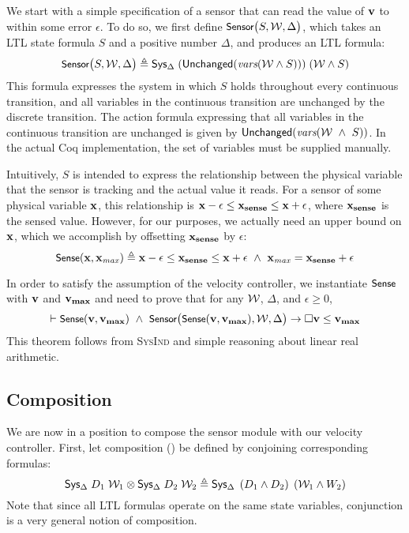 We start with a simple specification of a sensor that can read the value of
$\mathbf{v}$ to within some error $\epsilon$.  To do so, we first define
${\small \textsf{Sensor}}\big(S,\mathcal{W}, \Delta\big)$, which takes an LTL state formula $S$ and a
positive number $\Delta$, and produces an LTL formula:
\[
{\small \textsf{Sensor}}\big(S,\mathcal{W}, \Delta\big) \triangleq {\textsf{Sys}}{}_{\Delta}\;(\mathsf{Unchanged}(\textit{vars}(\mathcal{W} \wedge S)))\;(\mathcal{W} \wedge S)
\]
This formula expresses the system in which $S$ holds throughout every
continuous transition, and all variables in the continuous transition are
unchanged by the discrete transition. The action formula expressing that
all variables in the continuous transition are unchanged is given by
$\mathsf{Unchanged}(\textit{vars}(\mathcal{W}~\wedge~S))$. In the actual Coq implementation, the set
of variables must be supplied manually.

Intuitively, $S$ is intended to express the relationship between the
physical variable that the sensor is tracking and the actual value it
reads.  For a sensor of some physical variable $\mathbf{x}$, this relationship is
$\mathbf{x} - \epsilon \leq \mathbf{x_{sense}} \leq \mathbf{x} + \epsilon$, where $\mathbf{x_{sense}}$ is the
sensed value.  However, for our purposes, we actually need an upper bound
on $\mathbf{x}$, which we accomplish by offsetting $\mathbf{x_{sense}}$ by $\epsilon$:
\[
{\small \textsf{Sense}}(\mathbf{x},\mathbf{x_{\it max}}) \triangleq
\mathbf{x} - \epsilon \leq \mathbf{x_{sense}} \leq \mathbf{x} + \epsilon~\wedge~\mathbf{x_{\it max}} = \mathbf{x_{sense}} + \epsilon
\]

In order to satisfy the assumption of the velocity controller, we
instantiate ${\small \textsf{Sense}}{}$ with $\mathbf{v}$ and $\mathbf{v_{max}}$ and need to prove that for
any $\mathcal{W}$, $\Delta$, and $\epsilon \geq 0$,
\begin{equation}
\vdash {\small \textsf{Sense}}(\mathbf{v},\mathbf{v_{max}})~\wedge~{\small \textsf{Sensor}}\big({\small \textsf{Sense}}(\mathbf{v},\mathbf{v_{max}}),\mathcal{W}, \Delta\big) \rightarrow \Box{} \mathbf{v} \leq \mathbf{v_{max}}
\label{thm:sense-safe}
\end{equation}
This theorem follows from \textsc{SysInd} and simple reasoning about linear
real arithmetic.

\subsection{Composition}
We are now in a position to compose the sensor module with our velocity
controller.  First, let \SysA{} composition (\SysConjoin{}) be defined by
conjoining corresponding formulas:
\[
{\textsf{Sys}}{}_{\Delta}\;D_1\;\mathcal{W}_1 \otimes {\textsf{Sys}}{}_{\Delta}\;D_2\;\mathcal{W}_2 \triangleq {\textsf{Sys}}{}_{\Delta}\;\left(D_1 \wedge D_2\right)\;\left(\mathcal{W}_1 \wedge W_2\right)
\]
Note that since all LTL formulas operate on the same state variables,
conjunction is a very general notion of composition.

